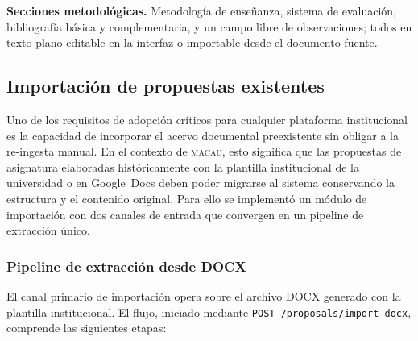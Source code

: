 \textbf{Secciones metodológicas.} Metodología de enseñanza, sistema de
evaluación, bibliografía básica y complementaria, y un campo libre de
observaciones; todos en texto plano editable en la interfaz o importable
desde el documento fuente.


\subsection{Importaci\'{o}n de propuestas existentes}
\label{sec:extraccion}

Uno de los requisitos de adopci\'{o}n cr\'{i}ticos para cualquier plataforma
institucional es la capacidad de incorporar el acervo documental preexistente
sin obligar a la re-ingesta manual. En el contexto de \textsc{macau}, esto
significa que las propuestas de asignatura elaboradas hist\'oricamente con la
plantilla institucional de la universidad o en Google~Docs deben poder migrarse al
sistema conservando la estructura y el contenido original. Para ello se
implement\'{o} un m\'{o}dulo de importaci\'{o}n con dos canales de entrada
que convergen en un pipeline de extracci\'{o}n \'{u}nico.

\subsubsection{Pipeline de extracci\'{o}n desde DOCX}
\label{subsubsec:import_docx}

El canal primario de importaci\'{o}n opera sobre el archivo DOCX generado con
la plantilla institucional. El flujo, iniciado mediante
\texttt{POST /proposals/import-docx}, comprende las siguientes etapas:

